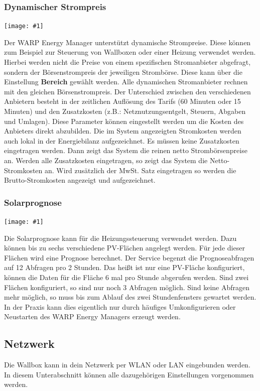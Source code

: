 \documentclass[a4paper,10pt]{article}
\newcommand{\gfx}[1]{\texttt{[image: \#1]}}
\begin{document}
\begin{multicols*}{2}
    \subsubsection{Dynamischer Strompreis}

	\gfx{./img_v2/wem2-web-dyn-price}

    Der WARP Energy Manager unterstützt dynamische Strompreise. Diese können zum Beispiel zur Steuerung von Wallboxen oder einer Heizung verwendet werden.
    Hierbei werden nicht die Preise von einem spezifischen Stromanbieter abgefragt, sondern der Börsenstrompreis der jeweiligen Strombörse.
    Diese kann über die Einstellung \textbf{Bereich} gewählt werden. Alle dynamischen Stromanbieter rechnen mit den gleichen Börsenstrompreis. Der Unterschied zwischen den verschiedenen Anbietern besteht
    in der zeitlichen Auflösung des Tarifs (60 Minuten oder 15 Minuten) und den Zusatzkosten (z.B.: Netznutzungsentgelt, Steuern, Abgaben und Umlagen). Diese Parameter können eingestellt werden um
    die Kosten des Anbieters direkt abzubilden. Die im System angezeigten Stromkosten werden auch lokal in der Energiebilanz aufgezeichnet. Es müssen keine Zusatzkosten eingetragen werden.
    Dann zeigt das System die reinen netto Strombörsenpreise an. Werden alle Zusatzkosten eingetragen, so zeigt das System die Netto-Stromkosten an. Wird zusätzlich der MwSt. Satz eingetragen so
    werden die Brutto-Stromkosten angezeigt und aufgezeichnet.



    \subsubsection{Solarprognose}

	\gfx{./img_v2/wem2-web-pv-prognosis}

    Die Solarprognose kann für die Heizungssteuerung verwendet werden. Dazu können bis zu sechs verschiedene PV-Flächen angelegt werden. Für jede dieser Flächen wird eine Prognose berechnet.
    Der Service begenzt die Prognoseabfragen auf 12 Abfragen pro 2 Stunden. Das heißt ist nur eine PV-Fläche konfiguriert, können die Daten für die Fläche 6 mal pro Stunde abgerufen werden.
    Sind zwei Flächen konfiguriert, so sind nur noch 3 Abfragen möglich. Sind keine Abfragen mehr möglich, so muss bis zum Ablauf des zwei Stundenfensters gewartet werden. In der Praxis kann dies eigentlich nur
    durch häufiges Umkonfigurieren oder Neustarten des WARP Energy Managers erzeugt werden.


	\subsection{Netzwerk}
	\label{network}
	Die Wallbox kann in dein Netzwerk per WLAN oder LAN eingebunden werden.
	In diesem Unterabschnitt können alle dazugehörigen Einstellungen vorgenommen werden.


\end{multicols*}
\end{document}
